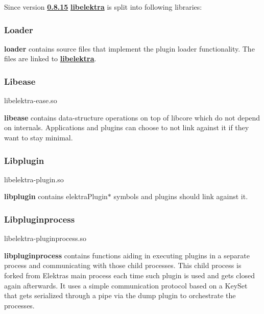 Since version {\bfseries \hyperlink{doc_decisions_library_split_md}{0.8.15}} {\bfseries \hyperlink{md_src_libs_elektra_README_src_libs_elektra_README_md}{libelektra}} is split into following libraries\+:

 \subsubsection*{Loader}

{\bfseries loader} contains source files that implement the plugin loader functionality. The files are linked to {\bfseries \hyperlink{md_src_libs_elektra_README_src_libs_elektra_README_md}{libelektra}}.

\subsubsection*{Libease}

\begin{DoxyVerb}libelektra-ease.so
\end{DoxyVerb}


{\bfseries libease} contains data-\/structure operations on top of libcore which do not depend on internals. Applications and plugins can choose to not link against it if they want to stay minimal.

\subsubsection*{Libplugin}

\begin{DoxyVerb}libelektra-plugin.so
\end{DoxyVerb}


{\bfseries libplugin} contains {\ttfamily elektra\+Plugin$\ast$} symbols and plugins should link against it.

\subsubsection*{Libpluginprocess}

\begin{DoxyVerb}libelektra-pluginprocess.so
\end{DoxyVerb}


{\bfseries libpluginprocess} contains functions aiding in executing plugins in a separate process and communicating with those child processes. This child process is forked from Elektra\textquotesingle{}s main process each time such plugin is used and gets closed again afterwards. It uses a simple communication protocol based on a Key\+Set that gets serialized through a pipe via the dump plugin to orchestrate the processes.

